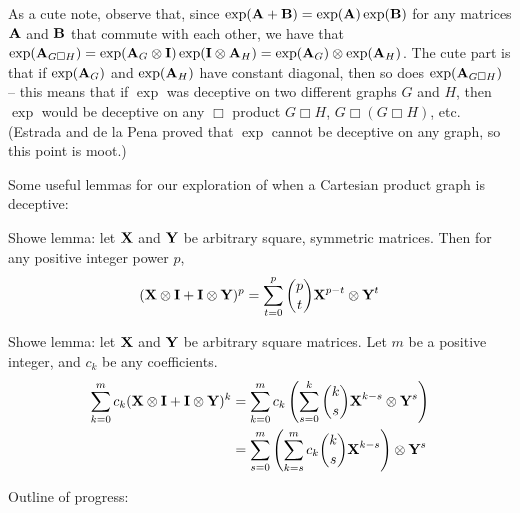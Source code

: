 As a cute note, observe that, since $\exp(\textbf{A} + \textbf{B}) = \exp(\textbf{A})\exp(\textbf{B})$ for any matrices $\textbf{A}$ and $\textbf{B}$ that commute with each other, we have that $\exp( \textbf{A}_{G \Box H}) = \exp(\textbf{A}_G \otimes \textbf{I} ) \exp(\textbf{I} \otimes \textbf{A}_{H}) = \exp(\textbf{A}_G)\otimes \exp(\textbf{A}_H)$. The cute part is that if $\exp(\textbf{A}_G)$ and $\exp(\textbf{A}_H)$ have constant diagonal, then so does $\exp( \textbf{A}_{G \Box H})$ -- this means that if $\exp$ was deceptive on two different graphs $G$ and $H$, then $\exp$ would be deceptive on any $\Box$ product $G \Box H$, $G \Box (G \Box H)$, etc. (Estrada and de la Pena proved that $\exp$ cannot be deceptive on any graph, so this point is moot.)



Some useful lemmas for our exploration of when a Cartesian product graph is deceptive:

\begin{lemma}
  Showe lemma: let $\textbf{X}$ and $\textbf{Y}$ be arbitrary square, symmetric matrices. Then for any positive integer power $p$,
  \[
  (\textbf{X} \otimes \textbf{I} + \textbf{I} \otimes \textbf{Y})^p = \sum_{t=0}^p \binom{p}{t} \textbf{X}^{p-t} \otimes \textbf{Y}^t
  \]
\end{lemma}

\begin{lemma}
  Showe lemma: let $\textbf{X}$ and $\textbf{Y}$ be arbitrary square matrices. Let $m$ be a positive integer, and $c_k$ be any coefficients.
  \begin{align}
  \sum_{k=0}^m c_k (\textbf{X} \otimes \textbf{I} + \textbf{I} \otimes \textbf{Y})^k &=
    \sum_{k=0}^m c_k \left(\sum_{s=0}^k \binom{k}{s} \textbf{X}^{k-s}\otimes \textbf{Y}^s \right) \\
    &= \sum_{s=0}^m \left( \sum_{k=s}^m c_k \binom{k}{s} \textbf{X}^{k-s} \right)\otimes \textbf{Y}^s
  \end{align}
\end{lemma}


Outline of progress:

